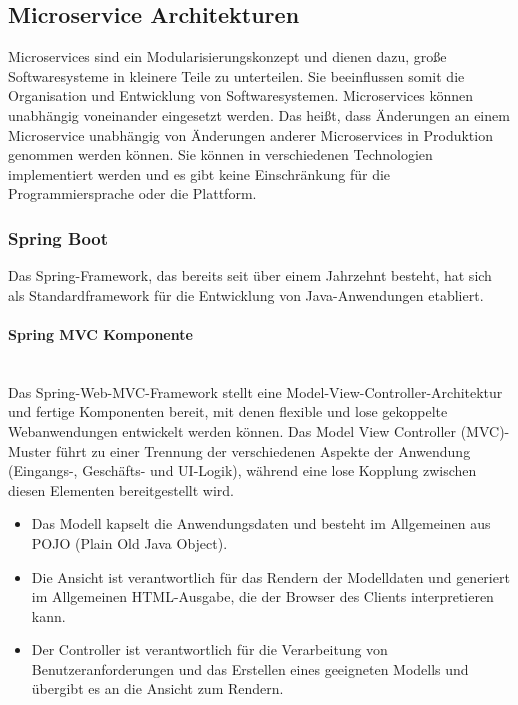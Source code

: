 \subsection{Microservice Architekturen}

Microservices sind ein Modularisierungskonzept und dienen dazu, große Softwaresysteme in kleinere Teile zu unterteilen. Sie beeinflussen somit die Organisation und Entwicklung von Softwaresystemen. Microservices können unabhängig voneinander eingesetzt werden. Das heißt, dass Änderungen an einem Microservice unabhängig von Änderungen anderer Microservices in Produktion genommen werden können. Sie können in verschiedenen Technologien implementiert werden und es gibt keine Einschränkung für die Programmiersprache oder die Plattform\cite[45--46]{wolff2016microservices}.

\subsubsection{Spring Boot}

Das Spring-Framework, das bereits seit über einem Jahrzehnt besteht, hat sich als Standardframework für die Entwicklung von Java-Anwendungen etabliert.

\paragraph{Spring MVC Komponente}\mbox{}\\

Das Spring-Web-MVC-Framework stellt eine Model-View-Controller-Architektur und fertige Komponenten bereit, mit denen flexible und lose gekoppelte Webanwendungen entwickelt werden können. Das Model View Controller (MVC)-Muster führt zu einer Trennung der verschiedenen Aspekte der Anwendung (Eingangs-, Geschäfts- und UI-Logik), während eine lose Kopplung zwischen diesen Elementen bereitgestellt wird\cite{tp12mvc}.

\begin{itemize}
	\item Das Modell kapselt die Anwendungsdaten und besteht im Allgemeinen aus POJO (Plain Old Java Object).
	\item Die Ansicht ist verantwortlich für das Rendern der Modelldaten und generiert im Allgemeinen HTML-Ausgabe, die der Browser des Clients interpretieren kann.
	\item Der Controller ist verantwortlich für die Verarbeitung von Benutzeranforderungen und das Erstellen eines geeigneten Modells und übergibt es an die Ansicht zum Rendern.
\end{itemize}

